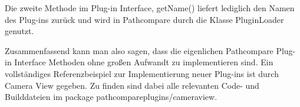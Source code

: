 Die zweite Methode im Plug-in Interface, getName() liefert lediglich den Namen
des Plug-ins zurück und wird in Pathcompare durch die Klasse PluginLoader
genutzt.

Zusammenfassend kann man also sagen, dass die eigenlichen Pathcompare Plug-in Interface
Methoden ohne großen Aufwandt zu implementieren sind. Ein vollständiges
Referenzbeispiel zur Implementierung neuer Plug-ins ist durch Camera View gegeben.
Zu finden sind dabei alle relevanten Code- und Builddateien im package 
pathcompareplugins/cameraview.

